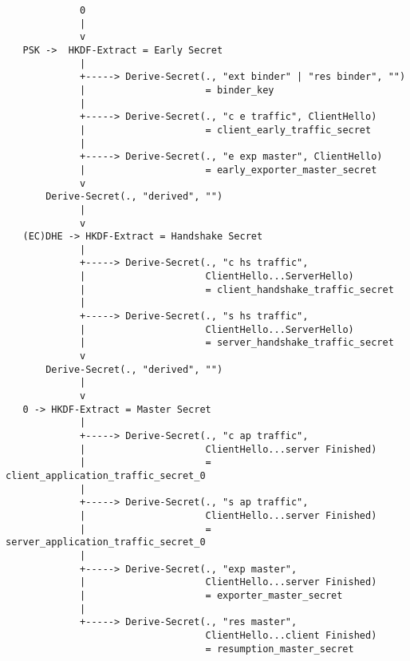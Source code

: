 \documentclass[a4paper]{article}
\begin{document}
\begin{verbatim}
             0
             |
             v
   PSK ->  HKDF-Extract = Early Secret
             |
             +-----> Derive-Secret(., "ext binder" | "res binder", "")
             |                     = binder_key
             |
             +-----> Derive-Secret(., "c e traffic", ClientHello)
             |                     = client_early_traffic_secret
             |
             +-----> Derive-Secret(., "e exp master", ClientHello)
             |                     = early_exporter_master_secret
             v
       Derive-Secret(., "derived", "")
             |
             v
   (EC)DHE -> HKDF-Extract = Handshake Secret
             |
             +-----> Derive-Secret(., "c hs traffic",
             |                     ClientHello...ServerHello)
             |                     = client_handshake_traffic_secret
             |
             +-----> Derive-Secret(., "s hs traffic",
             |                     ClientHello...ServerHello)
             |                     = server_handshake_traffic_secret
             v
       Derive-Secret(., "derived", "")
             |
             v
   0 -> HKDF-Extract = Master Secret
             |
             +-----> Derive-Secret(., "c ap traffic",
             |                     ClientHello...server Finished)
             |                     = client_application_traffic_secret_0
             |
             +-----> Derive-Secret(., "s ap traffic",
             |                     ClientHello...server Finished)
             |                     = server_application_traffic_secret_0
             |
             +-----> Derive-Secret(., "exp master",
             |                     ClientHello...server Finished)
             |                     = exporter_master_secret
             |
             +-----> Derive-Secret(., "res master",
                                   ClientHello...client Finished)
                                   = resumption_master_secret
\end{verbatim}
\end{document}
